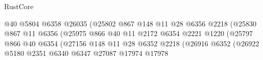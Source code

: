 \begin{lexlean}{RustCore}
\begin{coremodule}
                                                @40
                                                @5804
                                                @6358
                                                @26035
                                                (@25802
                                                  @867
                                                  @148
                                                  @11
                                                  @28
                                                  @6356
                                                  @2218
                                                  (@25830
                                                    @867
                                                    @11
                                                    @6356
                                                    (@25975
                                                      @866
                                                      @40
                                                      @11
                                                      @2172
                                                      @6354
                                                      @2221
                                                      @1220
                                                      (@25797
                                                        @866
                                                        @40
                                                        @6354
                                                        (@27156
                                                          @148
                                                          @11
                                                          @28
                                                          @6352
                                                          @2218
                                                          (@26916
                                                            @6352
                                                            (@26922
                                                              @5180
                                                              @2351
                                                              @6340
                                                              @6347
                                                              @27087
                                                              @17974
                                                              @17978

\end{coremodule}
\end{lexlean}
